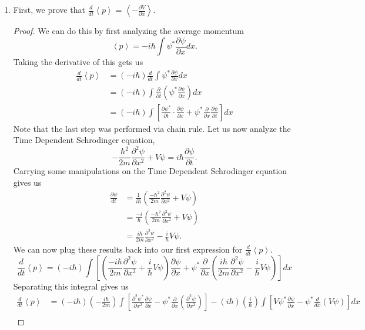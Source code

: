 \begin{sol}
\begin{enumerate}[label=\textbf{(\alph*)}]
\item First, we prove that $\frac{d}{dt}\left<p\right> = \left<-\frac{\partial V}{\partial x}\right>$. 
\begin{proof}
We can do this by first analyzing the average momentum 
\[\left<p\right> = -i\hbar \int \psi^* \frac{\partial\psi}{\partial x}dx.\]
Taking the derivative of this gets us 
\begin{align*}
    \frac{d}{dt}\left<p\right> &= (-i\hbar)\frac{d}{dt}\int \psi^* \frac{\partial \psi}{\partial x} dx\\
    &= (-i\hbar)\int \frac{\partial}{\partial t}\left(\psi^* \frac{\partial\psi}{\partial x}\right)dx\\
    &= (-i\hbar)\int \left[\frac{\partial \psi^*}{\partial t}\cdot \frac{\partial \psi}{\partial x} + \psi^*\frac{\partial}{\partial x}\frac{\partial \psi}{\partial t}\right]dx
\end{align*}
Note that the last step was performed via chain rule. Let us now analyze the Time Dependent Schrodinger equation,
\[-\frac{\hbar^2}{2m}\frac{\partial^2\psi}{\partial x^2} + V\psi = i\hbar\frac{\partial \psi}{\partial t}.\]
Carrying some manipulations on the Time Dependent Schrodinger equation gives us
\begin{align*}
    \frac{\partial \psi}{dt} &= \frac{1}{i\hbar}\left(\frac{-\hbar^2}{2m}\frac{\partial^2\psi}{\partial x^2} + V\psi\right)\\
    &= \frac{-i}{\hbar}\left(\frac{-\hbar^2}{2m}\frac{\partial^2\psi}{\partial x^2} + V\psi\right)\\
    &= \frac{i\hbar}{2m}\frac{\partial^2\psi}{\partial x^2} - \frac{i}{\hbar}V\psi.
\end{align*}
We can now plug these results back into our first expression for $\frac{d}{dt}\left<p\right>$. 
\[\frac{d}{dt}\left<p\right> = (-i\hbar)\int\left[\left(\frac{-i\hbar}{2m}\frac{\partial^2\psi}{\partial x^2} + \frac{i}{\hbar}V\psi\right)\frac{\partial \psi}{\partial x} + \psi^*\frac{\partial}{\partial x}\left(\frac{i\hbar}{2m}\frac{\partial^2\psi}{\partial x^2} - \frac{i}{\hbar}V\psi\right)\right]dx\]
Separating this integral gives us 
\begin{align*}
    \frac{d}{dt}\left<p\right> &= (-i\hbar)\left(-\frac{i\hbar}{2m}\right)\int\left[\frac{\partial^2\psi^*}{\partial x^2}\frac{\partial \psi}{\partial x} - \psi^*\frac{\partial}{\partial x}\left(\frac{\partial^2\psi}{\partial x^2}\right)\right] - (i\hbar)\left(\frac{i}{\hbar}\right)\int\left[V\psi^*\frac{\partial \psi}{\partial x} - \psi^*\frac{d}{dx}(V\psi)\right]dx\\

\end{align*}
\end{proof}
\end{enumerate}
\end{sol}
